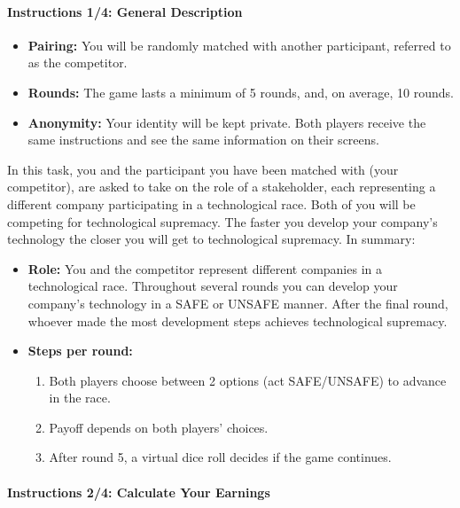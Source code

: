 \documentclass[pdflatex,sn-mathphys-ay]{sn-jnl}
\theoremstyle{thmstyleone}
\theoremstyle{thmstyletwo}
\theoremstyle{thmstylethree}
\begin{document}
\paragraph{Instructions 1/4: General Description}

\begin{itemize}
    \item \textbf{Pairing:} You will be randomly matched with another participant, referred to as the competitor.
    \item \textbf{Rounds:} The game lasts a minimum of 5 rounds, and, on average, 10 rounds.
    \item \textbf{Anonymity:} Your identity will be kept private. Both players receive the same instructions and see the same information on their screens.
\end{itemize}

\noindent In this task, you and the participant you have been matched with (your competitor), are asked to take on the role of a stakeholder, each representing a different company participating in a technological race. Both of you will be competing for technological supremacy. The faster you develop your company’s technology the closer you will get to technological supremacy. In summary:

\begin{itemize}
    \item \textbf{Role:} You and the competitor represent different companies in a technological race. Throughout several rounds you can develop your company’s technology in a SAFE or UNSAFE manner. After the final round, whoever made the most development steps achieves technological supremacy.
    \item \textbf{Steps per round:}
    \begin{enumerate}
        \item Both players choose between 2 options (act SAFE/UNSAFE) to advance in the race.
        \item Payoff depends on both players' choices.
        \item After round 5, a virtual dice roll decides if the game continues.
    \end{enumerate}
\end{itemize}

\paragraph{Instructions 2/4: Calculate Your Earnings}
\end{document}

